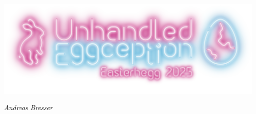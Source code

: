 \documentclass[aspectratio=169]{beamer}
\begin{document}

\begin{frame}{}
    \centering
    \includegraphics[width=.7\textwidth]{figures/logo_easterhegg.png}
    \vspace{1cm}

    \textit{Andreas Bresser}
\end{frame}
\end{document}
